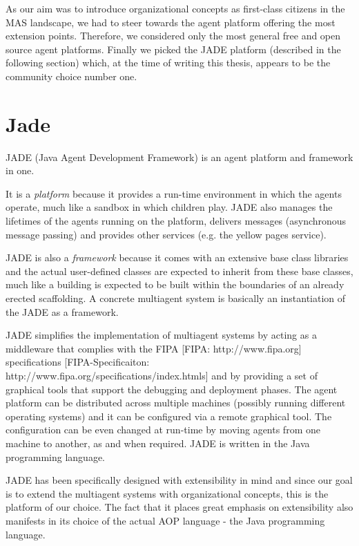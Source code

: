 As our aim was to introduce organizational concepts as first-class citizens in the MAS landscape, we had to steer towards the agent platform offering the most extension points.
Therefore, we considered only the most general free and open source agent platforms.
Finally we picked the JADE platform (described in the following section) which, at the time of writing this thesis, appears to be the community choice number one.  

\section{Jade}

JADE (Java Agent Development Framework) is an agent platform and framework in one.

It is a \textit{platform} because it provides a run-time environment in which the agents operate, much like a sandbox in which children play.
JADE also manages the lifetimes of the agents running on the platform, delivers messages (asynchronous message passing) and provides other services (e.g. the yellow pages service).

JADE is also a \textit{framework} because it comes with an extensive base class libraries and the actual user-defined classes are expected to inherit from these base classes, much like a building is expected to be built within the boundaries of an already erected scaffolding.
A concrete multiagent system is basically an instantiation of the JADE as a framework.

JADE simplifies the implementation of multiagent systems by acting as a middleware that complies with the FIPA
[FIPA: http://www.fipa.org]
specifications
[FIPA-Specificaiton: http://www.fipa.org/specifications/index.htmls] and by providing a set of graphical tools that support the debugging and deployment phases.
The agent platform can be distributed across multiple machines (possibly running different operating systems) and it can be configured via a remote graphical tool.
The configuration can be even changed at run-time by moving agents from one machine to another, as and when required. 
JADE is written in the Java programming language. 

JADE has been specifically designed with extensibility in mind and since our goal is to extend the multiagent systems with organizational concepts, this is the platform of our choice.
The fact that it places great emphasis on extensibility also manifests in its choice of the actual AOP language - the Java programming language.

